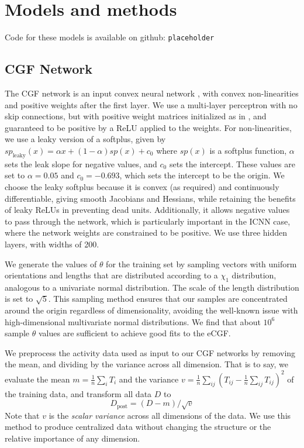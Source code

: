 \documentclass{article}      %
\begin{document}
\section{Models and methods}

Code for these models is available on github: \texttt{placeholder}

\subsection{CGF Network} \label{sec:network_architecture}

The CGF network is an input convex neural network \cite{amos_input_2017}, with convex non-linearities and positive weights after the first layer.
We use a multi-layer perceptron with no skip connections, but with positive weight matrices initialized as in \cite{hoedt_principled_2023}, and guaranteed to be positive by a ReLU applied to the weights.
For non-linearities, we use a leaky version of a softplus, given by $sp_{\textrm{leaky}}(x) = \alpha x + (1 - \alpha) sp(x) + c_0$ where $sp(x)$ is a softplus function, $\alpha$ sets the leak slope for negative values, and $c_0$ sets the intercept. 
These values are set to $\alpha =0.05$ and $c_0 = -0.693$, which sets the intercept to be the origin.
We choose the leaky softplus because it is convex (as required) and continuously differentiable, giving smooth Jacobians and Hessians, while retaining the benefits of leaky ReLUs in preventing dead units.
Additionally, it allows negative values to pass through the network, which is particularly important in the ICNN case, where the network weights are constrained to be positive.
We use three hidden layers, with widths of 200.

We generate the values of $\theta$ for the training set by sampling vectors with uniform orientations and lengths that are distributed according to a $\chi_1$ distribution, analogous to a univariate normal distribution.
The scale of the length distribution is set to $\sqrt{5}$.
This sampling method ensures that our samples are concentrated around the origin regardless of dimensionality, avoiding the well-known issue with high-dimensional multivariate normal distributions.
We find that about $10^6$ sample $\theta$ values are sufficient to achieve good fits to the eCGF.


We preprocess the activity data used as input to our CGF networks by removing the mean, and dividing by the variance across all dimension.
That is to say, we evaluate the mean $m = \frac{1}{n} \sum_i T_i$ and the variance ${v = \frac{1}{n}\sum_{ij} \left(T_{ij} - \frac{1}{n}\sum_{ij} T_{ij} \right)^2}$ of the training data, and transform all data $D$ to
\begin{equation}
  D_{\textrm{post}} = (D - m) /\sqrt{v}
\end{equation}
Note that $v$ is the \textit{scalar variance} across all dimensions of the data.
We use this method to produce centralized data without changing the structure or the relative importance of any dimension.
\end{document}
